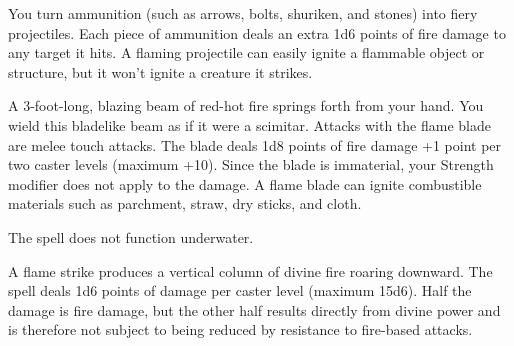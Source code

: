 \begin{multicols}{2}
\begin{small}

\noindent You turn ammunition (such as arrows, bolts, shuriken, and stones) into fiery projectiles. Each piece of ammunition deals an extra 1d6 points of fire damage to any target it hits. A flaming projectile can easily ignite a flammable object or structure, but it won't ignite a creature it strikes.


\noindent A 3-foot-long, blazing beam of red-hot fire springs forth from your hand. You wield this bladelike beam as if it were a scimitar. Attacks with the flame blade are melee touch attacks. The blade deals 1d8 points of fire damage +1 point per two caster levels (maximum +10). Since the blade is immaterial, your Strength modifier does not apply to the damage. A flame blade can ignite combustible materials such as parchment, straw, dry sticks, and cloth.

\smallskip\noindent The spell does not function underwater.

\noindent A flame strike produces a vertical column of divine fire roaring downward. The spell deals 1d6 points of damage per caster level (maximum 15d6). Half the damage is fire damage, but the other half results directly from divine power and is therefore not subject to being reduced by resistance to fire-based attacks.


\end{small}
\end{multicols}
